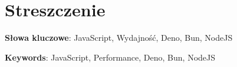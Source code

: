 \section*{Streszczenie}

\bigskip

\textbf{Słowa kluczowe}: JavaScript, Wydajność, Deno, Bun, NodeJS

\textbf{Keywords}: JavaScript, Performance, Deno, Bun, NodeJS
